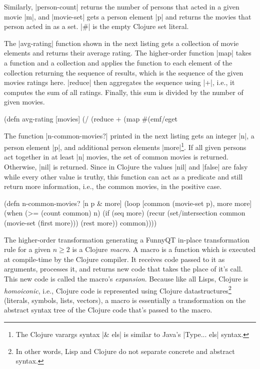 \documentclass[submission]{eptcs}
\newcommand{\code}{\clojureinline}
\begin{document}
Similarly, \code|person-count| returns the number of persons that acted in a
given movie \code|m|, and \code|movie-set| gets a person element \code|p| and
returns the movies that person acted in as a set.  \code|#{}| is the empty
Clojure set literal.

The \code|avg-rating| function shown in the next listing gets a collection of
movie elements and returns their average rating.  The higher-order function
\code|map| takes a function and a collection and applies the function to each
element of the collection returning the sequence of results, which is the
sequence of the given movies ratings here.  \code|reduce| then aggregates the
sequence using \code|+|, i.e., it computes the sum of all ratings.  Finally,
this sum is divided by the number of given movies.

\begin{clojurecode}
(defn avg-rating [movies]
  (/ (reduce + (map #(emf/eget %
\end{clojurecode}

The function \code|n-common-movies?| printed in the next listing gets an
integer \code|n|, a person element \code|p|, and additional person elements
\code|more|\footnote{The Clojure varargs syntax \code|& els| is similar to
  Java's \code|Type... els| syntax.}.  If all given persons act together in at
least \code|n| movies, the set of common movies is returned.  Otherwise,
\code|nil| is returned.  Since in Clojure the values \code|nil| and
\code|false| are falsy while every other value is truthy, this function can act
as a predicate and still return more information, i.e., the common movies, in
the positive case.

\begin{clojurecode}
(defn n-common-movies? [n p & more]
  (loop [common (movie-set p), more more]
    (when (>= (count common) n)
      (if (seq more)
        (recur (set/intersection common (movie-set (first more))) (rest more))
        common))))
\end{clojurecode}

The higher-order transformation generating a FunnyQT in-place transformation
rule for a given \(n \geq 2\)
is a Clojure \emph{macro}.  A macro is a function which is executed at
compile-time by the Clojure compiler.  It receives code passed to it as
arguments, processes it, and returns new code that takes the place of it's
call.  This new code is called the macro's \emph{expansion}.  Because like all
Lisps, Clojure is \emph{homoiconic}, i.e., Clojure code is represented using
Clojure datastructures\footnote{In other words, Lisp and Clojure do not
  separate concrete and abstract syntax.} (literals, symbols, lists, vectors),
a macro is essentially a transformation on the abstract syntax tree of the
Clojure code that's passed to the macro.
\end{document}
